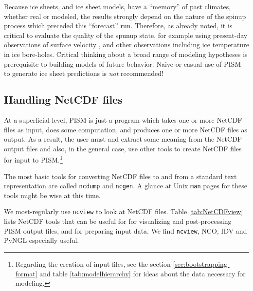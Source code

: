 Because ice sheets, and ice sheet models, have a ``memory'' of past climates, whether real or modeled, the results strongly depend on the nature of the spinup process which preceded this ``forecast'' run.  Therefore, as already noted, it is critical to evaluate the quality of the spunup state, for example using present-day observations of surface velocity \cite{BKAJS}, and other observations including ice temperature in ice bore-holes.  Critical thinking about a broad range of modeling hypotheses is prerequisite to building models of future behavior.  Naive or casual use of PISM to generate ice sheet predictions is \emph{not} recommended!


\subsection{Handling NetCDF files}\label{subsect:nctoolsintro}  At a superficial level, PISM is just a program which takes one or more NetCDF files as input, does some computation, and produces one or more NetCDF files as output.  As a result, the user must and extract some meaning from the NetCDF output files and also, in the general case, use other tools to create NetCDF files for input to PISM.\footnote{Regarding the creation of input files, see the section \ref{sec:bootstrapping-format} and table \ref{tab:modelhierarchy} for ideas about the data necessary for modeling.}

The most basic tools for converting NetCDF files to and from a standard text representation are called \texttt{ncdump} and \texttt{ncgen}.  A glance at Unix \texttt{man} pages for these tools might be wise at this time.

We most-regularly use \texttt{ncview} to look at NetCDF files.  Table \ref{tab:NetCDFview} lists NetCDF tools that can be useful for for visualizing and post-processing PISM output files, and for preparing input data.  We find \texttt{ncview}, NCO, IDV and PyNGL especially useful.

